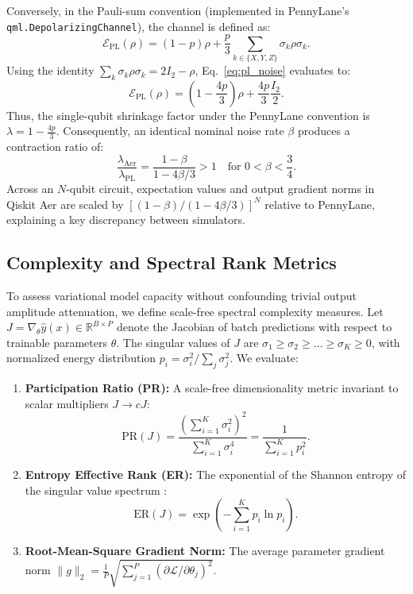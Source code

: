 \documentclass[sn-apacite,Numbered]{sn-jnl}
\begin{document}
Conversely, in the Pauli-sum convention (implemented in PennyLane's \texttt{qml.DepolarizingChannel}), the channel is defined as:
\begin{equation}
\mathcal{E}_{\text{PL}}(\rho) = (1 - p)\rho + \frac{p}{3} \sum_{k \in \{X, Y, Z\}} \sigma_k \rho \sigma_k.
\label{eq:pl_noise}
\end{equation}
Using the identity $\sum_k \sigma_k \rho \sigma_k = 2 I_2 - \rho$, Eq.~\eqref{eq:pl_noise} evaluates to:
\begin{equation}
\mathcal{E}_{\text{PL}}(\rho) = \left(1 - \frac{4p}{3}\right)\rho + \frac{4p}{3} \frac{I_2}{2}.
\label{eq:pl_converted}
\end{equation}
Thus, the single-qubit shrinkage factor under the PennyLane convention is $\lambda = 1 - \frac{4p}{3}$. Consequently, an identical nominal noise rate $\beta$ produces a contraction ratio of:
\begin{equation}
\frac{\lambda_{\text{Aer}}}{\lambda_{\text{PL}}} = \frac{1 - \beta}{1 - 4\beta/3} > 1 \quad \text{for } 0 < \beta < \frac{3}{4}.
\end{equation}
Across an $N$-qubit circuit, expectation values and output gradient norms in Qiskit Aer are scaled by $[(1-\beta)/(1-4\beta/3)]^N$ relative to PennyLane, explaining a key discrepancy between simulators.

\subsection{Complexity and Spectral Rank Metrics}
To assess variational model capacity without confounding trivial output amplitude attenuation, we define scale-free spectral complexity measures. Let $J = \nabla_\theta \hat{y}(x) \in \mathbb{R}^{B \times P}$ denote the Jacobian of batch predictions with respect to trainable parameters $\theta$. The singular values of $J$ are $\sigma_1 \ge \sigma_2 \ge \dots \ge \sigma_K \ge 0$, with normalized energy distribution $p_i = \sigma_i^2 / \sum_j \sigma_j^2$.
We evaluate:
\begin{enumerate}
    \item \textbf{Participation Ratio (PR):} A scale-free dimensionality metric invariant to scalar multipliers $J \to c J$:
    \begin{equation}
    \text{PR}(J) = \frac{\left( \sum_{i=1}^K \sigma_i^2 \right)^2}{\sum_{i=1}^K \sigma_i^4} = \frac{1}{\sum_{i=1}^K p_i^2}.
    \label{eq:pr}
    \end{equation}
    \item \textbf{Entropy Effective Rank (ER):} The exponential of the Shannon entropy of the singular value spectrum \cite{roy2007effective}:
    \begin{equation}
    \text{ER}(J) = \exp\left( - \sum_{i=1}^K p_i \ln p_i \right).
    \label{eq:er}
    \end{equation}
    \item \textbf{Root-Mean-Square Gradient Norm:} The average parameter gradient norm $\|g\|_2 = \frac{1}{P} \sqrt{\sum_{j=1}^P (\partial \mathcal{L} / \partial \theta_j)^2}$.
\end{enumerate}
\end{document}
